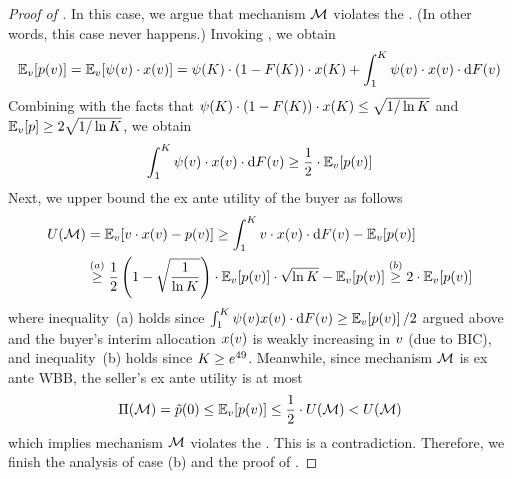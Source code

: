 \begin{proof}[Proof of ]
     In this case, we argue that mechanism $\mathcal{M}$ violates the {\equitability}. (In other words, this case never happens.) Invoking , we obtain
    \begin{align*}
        \expect[\val]{\price(\val)} = \expect[\val]{\virtualval(\val)\cdot \alloc(\val)} = \virtualval(\constantH)\cdot (1 - \buyercdf(\constantH))\cdot \alloc(\constantH) 
        +
        \displaystyle\int_{1}^\constantH \virtualval(\val)\cdot \alloc(\val)\cdot\d \buyercdf(\val)
    \end{align*}
    Combining with the facts that $\psi(K)\cdot (1 - F(K))\cdot x(K)  \leq \sqrt{1/\ln K}$ and $\expect[\val]{\price} \geq 2\sqrt{1/\ln\constantH}$, we obtain
    \begin{align*}
        \displaystyle\int_{1}^\constantH \virtualval(\val)\cdot \alloc(\val)\cdot\d \buyercdf(\val)
        \geq \frac{1}{2}\cdot \expect[\val]{\price(\val)}
    \end{align*}
    Next, we upper bound the ex ante utility of the buyer as follows
    \begin{align*}
        \buyerexanteutil(\mech) &{} = \expect[\val]{\val\cdot \alloc(\val) - \price(\val)}
        \geq 
        \int_1^\constantH \val\cdot \alloc(\val)\cdot \d\buyercdf(\val) - 
        \expect[\val]{\price(\val)}
        \\
        &{}\overset{(a)}{\geq}
        \frac{1}{2}\left(1 - \sqrt{\frac{1}{\ln\constantH}}\right)\cdot \expect[\val]{\price(\val)}\cdot \sqrt{\ln\constantH} - \expect[\val]{\price(\val)} \overset{(b)}{\geq} 2 \cdot \expect[\val]{\price(\val)}
    \end{align*}
    where inequality~(a) holds since $\int_1^\constantH\virtualval(\val)\alloc(\val)\cdot\d\buyercdf(\val) \geq \expect[\val]{\price(\val)}/2$ argued above and the buyer's interim allocation $x(v)$ is weakly increasing in $v$ (due to BIC), and inequality~(b) holds since $K\geq e^{49}$. Meanwhile, since mechanism $\mathcal{M}$ is ex ante WBB, the seller's ex ante utility is at most 
    \begin{align*}
        \sellerexanteutil(\mech) = \sellerprice(0) \leq \expect[\val]{\price(\val)} \leq \frac{1}{2}\cdot \buyerexanteutil(\mech) < \buyerexanteutil(\mech)
    \end{align*}
    which implies mechanism $\mathcal{M}$ violates the {\equitability}. This is a contradiction. Therefore, we finish the analysis of case (b) and the proof of .
\end{proof}
